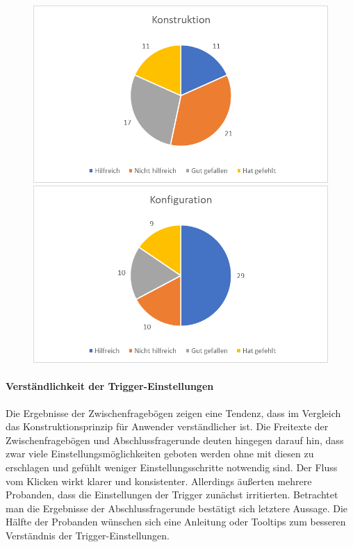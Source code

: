\begin{figure}
   \begin{minipage}[b]{.49\linewidth} %
      \includegraphics[width=\linewidth]{pictures/diagramme/aussagenkonstr}
   \end{minipage}
   \hspace{.01\linewidth}%
   \begin{minipage}[b]{.49\linewidth} %
      \includegraphics[width=\linewidth]{pictures/diagramme/aussagenkonfig}
   \end{minipage}
   \caption{}
   \label{konfigabsch}
   \label{konstrabsch}
\end{figure}



\paragraph{Verständlichkeit der Trigger-Einstellungen}
Die Ergebnisse der Zwischenfragebögen zeigen eine Tendenz, dass im Vergleich das Konstruktionsprinzip für Anwender verständlicher ist. Die Freitexte der Zwischenfragebögen und Abschlussfragerunde deuten hingegen darauf hin, dass zwar viele Einstellungsmöglichkeiten geboten werden ohne mit diesen zu erschlagen und gefühlt weniger Einstellungsschritte notwendig sind. Der Fluss vom Klicken wirkt klarer und konsistenter. Allerdings äußerten mehrere Probanden, dass die Einstellungen der Trigger zunächst irritierten. Betrachtet man die Ergebnisse der Abschlussfragerunde bestätigt sich letztere Aussage. Die Hälfte der Probanden wünschen sich eine Anleitung oder Tooltips zum besseren Verständnis der Trigger-Einstellungen.


